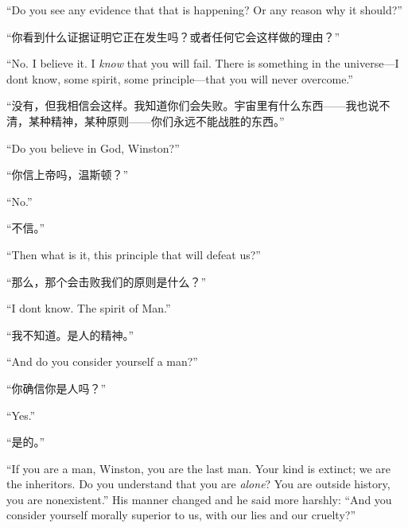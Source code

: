 \begin{paracol}{2}
\switchcolumn*

``Do you see any evidence that that is happening? Or any reason why it
should?''

\switchcolumn

``你看到什么证据证明它正在发生吗？或者任何它会这样做的理由？''

\switchcolumn*

``No. I believe it. I \emph{know} that you will fail. There is something
in the universe---I don\textquotesingle t know, some spirit, some
principle---that you will never overcome.''

\switchcolumn

``没有，但我相信会这样。我知道你们会失败。宇宙里有什么东西——我也说不清，某种精神，某种原则——你们永远不能战胜的东西。''

\switchcolumn*

``Do you believe in God, Winston?''

\switchcolumn

``你信上帝吗，温斯顿？''

\switchcolumn*

``No.''

\switchcolumn

``不信。''

\switchcolumn*

``Then what is it, this principle that will defeat us?''

\switchcolumn

``那么，那个会击败我们的原则是什么？''

\switchcolumn*

``I don\textquotesingle t know. The spirit of Man.''

\switchcolumn

``我不知道。是人的精神。''

\switchcolumn*

``And do you consider yourself a man?''

\switchcolumn

``你确信你是人吗？''

\switchcolumn*

``Yes.''

\switchcolumn

``是的。''

\switchcolumn*

``If you are a man, Winston, you are the last man. Your kind is extinct;
we are the inheritors. Do you understand that you are \emph{alone}? You
are outside history, you are nonexistent.'' His manner changed and he
said more harshly: ``And you consider yourself morally superior to us,
with our lies and our cruelty?''


\end{paracol}
